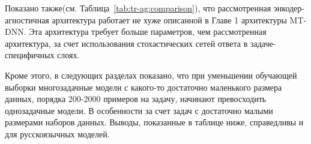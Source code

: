 Показано также(см. Таблица~\ref{tab:tr-ag:comparison}), что рассмотренная энкодер-агностичная архитектура работает не хуже описанной в Главе 1 архитектуры MT-DNN. Эта архитектура требует больше параметров, чем рассмотренная архитектура, за счет использования стохастических сетей ответа в задаче-специфичных слоях.

\begin{table}
 \caption{Точность/f1 macro на задачах из Таблицы~\ref{tab:tr-ag:en_results} для различных многозадачных моделей и число параметров у этих моделей, для базовой модели distilbert-base-cased. Энкодер-агн. означает энкодер-агностичную модель. Усреднено по 3 запускам.}
 \label{tab:tr-ag:comparison}
\centering
\resizebox{\textwidth}{!}{%
\begin{tabular}{|c|c|c|c|c|c|c|c|c|}
\hline
\multirow{2}{*}{Модель} & Число & \multirow{2}{*}{Среднее} & Эмоции & Тональность & Токсичность & Интенты & Темы & Число \\
& параметров & & 39.4k & 80.5k & 127.6k & 11.5k & 11.5k & батчей \\ \hline \hline
{Энкодер-агн.} & 65,850,714 & 82.1/77.2 & 67.7/60.7 & {75.2/75.0} & 90.6/79.8 & 86.3/80.4 & 90.8/90.1 & 14,000  \\ \hline
{MT-DNN} & 68,014,424 & 82.1/77.4 & 67.5/59.9 & 73.9/73.5 & 91.5/80.9 & 87.0/82.4 & 91.0/90.4 & 19,600 \\ \hline
\end{tabular}}
\end{table}

Кроме этого, в следующих разделах показано, что при уменьшении обучающей выборки многозадачные модели с какого-то достаточно маленького размера данных, порядка 200-2000 примеров на задачу, начинают превосходить однозадачные модели. В особенности за счет задач с достаточно малыми размерами наборов данных. Выводы, показанные в таблице ниже, справедливы и для русскоязычных моделей.

